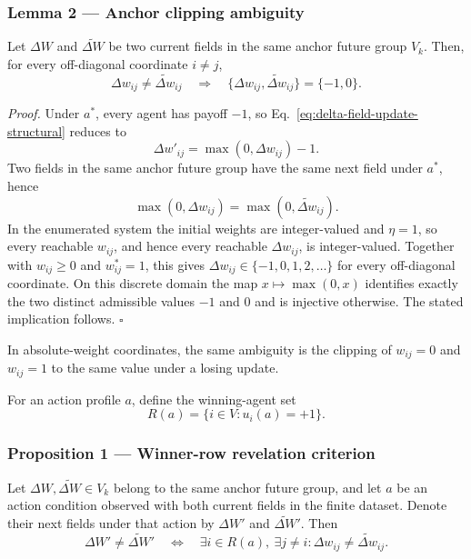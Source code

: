 \documentclass[
  11pt,
]{article}
\begin{document}
\subsubsection{Lemma 2 --- Anchor clipping ambiguity}\label{lemma-2-anchor-clipping}

Let \(\Delta W\) and \(\widetilde{\Delta W}\) be two current fields in
the same anchor future group \(V_k\).  Then, for every off-diagonal
coordinate \(i\neq j\),
\[
 \Delta w_{ij}\neq\widetilde{\Delta w}_{ij}
 \quad\Longrightarrow\quad
 \{\Delta w_{ij},\widetilde{\Delta w}_{ij}\}=\{-1,0\}.
 \tag{19}\label{eq:anchor-clipping-ambiguity}
\]

\emph{Proof.}
Under \(a^\ast\), every agent has payoff \(-1\), so
Eq.~\eqref{eq:delta-field-update-structural} reduces to
\[
 \Delta w'_{ij}=\max(0,\Delta w_{ij})-1.
\]
Two fields in the same anchor future group have the same next field under
\(a^\ast\), hence
\[
 \max(0,\Delta w_{ij})=\max(0,\widetilde{\Delta w}_{ij}).
\]
In the enumerated system the initial weights are integer-valued and
\(\eta=1\), so every reachable \(w_{ij}\), and hence every reachable
\(\Delta w_{ij}\), is integer-valued. Together with \(w_{ij}\ge0\) and
\(w^\ast_{ij}=1\), this gives
\(\Delta w_{ij}\in\{-1,0,1,2,\ldots\}\) for every off-diagonal
coordinate. On this discrete domain the map \(x\mapsto\max(0,x)\)
identifies exactly the two distinct admissible values \(-1\) and \(0\)
and is injective otherwise. The stated implication follows. \(\square\)

In absolute-weight coordinates, the same ambiguity is the clipping of
\(w_{ij}=0\) and \(w_{ij}=1\) to the same value under a losing update.

For an action profile \(a\), define the winning-agent set
\[
 R(a)=\{i\in V:u_i(a)=+1\}.
\]

\subsubsection{Proposition 1 --- Winner-row revelation criterion}\label{prop-winner-row-revelation}

Let \(\Delta W,\widetilde{\Delta W}\in V_k\) belong to the same anchor
future group, and let \(a\) be an action condition observed with both
current fields in the finite dataset.  Denote their next fields under
that action by \(\Delta W'\) and \(\widetilde{\Delta W}'\).  Then
\[
 \Delta W'\neq\widetilde{\Delta W}'
 \quad\Longleftrightarrow\quad
 \exists i\in R(a),\ \exists j\neq i:
 \Delta w_{ij}\neq\widetilde{\Delta w}_{ij}.
 \tag{20}\label{eq:winner-row-revelation}
\]
\end{document}
